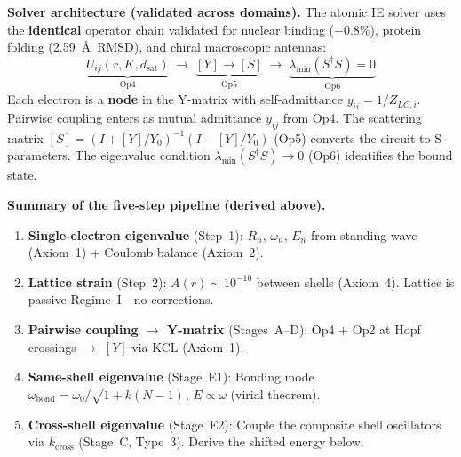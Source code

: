 \noindent\textbf{Solver architecture (validated across domains).}
The atomic IE solver uses the \textbf{identical} operator chain
validated for nuclear binding ($-0.8\%$), protein folding
(2.59~\AA\ RMSD), and chiral macroscopic antennas:
\begin{equation}
    \underbrace{U_{ij}(r,K,d_{\text{sat}})}_{\text{Op4}}
    \;\longrightarrow\;
    \underbrace{[Y] \to [S]}_{\text{Op5}}
    \;\longrightarrow\;
    \underbrace{\lambda_{\min}(S^\dagger S) = 0}_{\text{Op6}}
    \label{eq:solver_chain}
\end{equation}
Each electron is a \textbf{node} in the Y-matrix with
self-admittance $y_{ii} = 1/Z_{LC,i}$.
Pairwise coupling enters as mutual admittance
$y_{ij}$ from Op4. The scattering matrix
$[S] = (I + [Y]/Y_0)^{-1}(I - [Y]/Y_0)$ (Op5)
converts the circuit to S-parameters.
The eigenvalue condition $\lambda_{\min}(S^\dagger S) \to 0$
(Op6) identifies the bound state.

\noindent\textbf{Summary of the five-step pipeline
(derived above).}
\begin{enumerate}
    \item \textbf{Single-electron eigenvalue} (Step~1):
          $R_n$, $\omega_n$, $E_n$ from standing wave
          (Axiom~1) + Coulomb balance (Axiom~2).
    \item \textbf{Lattice strain} (Step~2):
          $A(r) \sim 10^{-10}$ between shells (Axiom~4).
          Lattice is passive Regime~I---no corrections.
    \item \textbf{Pairwise coupling $\to$ Y-matrix}
          (Stages~A--D):
          Op4 $+$ Op2 at Hopf crossings $\to$ $[Y]$
          via KCL (Axiom~1).
    \item \textbf{Same-shell eigenvalue} (Stage~E1):
          Bonding mode $\omega_{\text{bond}}
          = \omega_0/\sqrt{1 + k(N{-}1)}$,
          $E \propto \omega$ (virial theorem).
    \item \textbf{Cross-shell eigenvalue} (Stage~E2):
          Couple the composite shell oscillators
          via $k_{\text{cross}}$ (Stage~C, Type~3).
          Derive the shifted energy below.
\end{enumerate}

